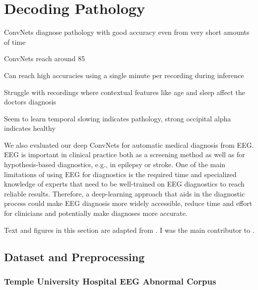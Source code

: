 \chapter{Decoding Pathology}\label{pathology}

\begin{startbox}{ConvNets diagnose pathology with good accuracy even from very short amounts of time} 
\item ConvNets reach around 85%
\item Can reach high accuracies using a single minute per recording during inference
\item Struggle with recordings where contextual features like age and sleep affect the doctors diagnosis
\item Seem to learn temporal slowing indicates pathology, strong occipital alpha indicates healthy
\end{startbox}


    We also evaluated our deep ConvNets for automatic medical diagnosis from
EEG. EEG is important in clinical practice both as a screening method as
well as for hypothesis-based diagnostics, e.g., in epilepsy or stroke.
One of the main limitations of using EEG for diagnostics is the required
time and specialized knowledge of experts that need to be well-trained
on EEG diagnostics to reach reliable results. Therefore, a deep-learning
approach that aids in the diagnostic process could make EEG diagnosis
more widely accessible, reduce time and effort for clinicians and
potentially make diagnoses more accurate. 

Text and figures in this
section are adapted from \citet{schirrmeisterdeeppathology}.
I was the main contributor to
\citet{schirrmeisterdeeppathology}.

\section{Dataset and Preprocessing}\label{dataset-and-preprocessing}

\subsection{Temple University Hospital EEG Abnormal
Corpus}\label{temple-university-hospital-eeg-abnormal-corpus}

